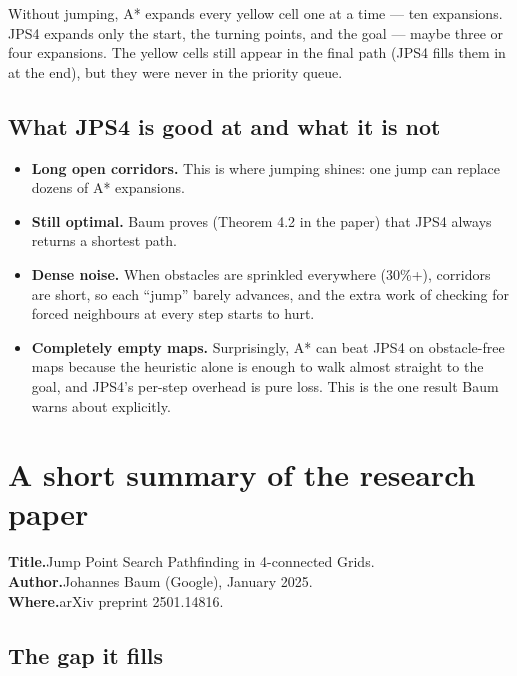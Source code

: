 \documentclass[11pt,a4paper]{article}
\begin{document}
\noindent Without jumping, A* expands every yellow cell one at a time --- ten expansions. JPS4 expands only the start, the turning points, and the goal --- maybe three or four expansions. The yellow cells still appear in the final path (JPS4 fills them in at the end), but they were never in the priority queue.

\subsection{What JPS4 is good at and what it is not}

\begin{itemize}[leftmargin=20pt,itemsep=2pt]
  \item[\textcolor{accent}{\textbf{+}}] \textbf{Long open corridors.} This is where jumping shines: one jump can replace dozens of A* expansions.
  \item[\textcolor{accent}{\textbf{+}}] \textbf{Still optimal.} Baum proves (Theorem 4.2 in the paper) that JPS4 always returns a shortest path.
  \item[\textcolor{accent2}{\textbf{--}}] \textbf{Dense noise.} When obstacles are sprinkled everywhere (30\%+), corridors are short, so each ``jump'' barely advances, and the extra work of checking for forced neighbours at every step starts to hurt.
  \item[\textcolor{accent2}{\textbf{--}}] \textbf{Completely empty maps.} Surprisingly, A* can beat JPS4 on obstacle-free maps because the heuristic alone is enough to walk almost straight to the goal, and JPS4's per-step overhead is pure loss. This is the one result Baum warns about explicitly.
\end{itemize}

\clearpage
\section{A short summary of the research paper}\label{sec:paper}

\textbf{Title.}\enspace Jump Point Search Pathfinding in 4-connected Grids.\\
\textbf{Author.}\enspace Johannes Baum (Google), January 2025.\\
\textbf{Where.}\enspace arXiv preprint 2501.14816.

\subsection{The gap it fills}
\end{document}
